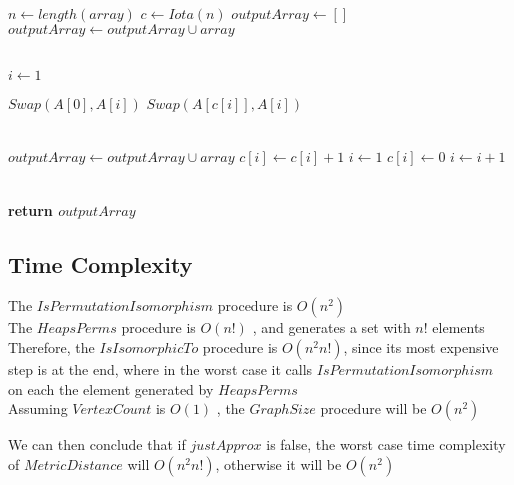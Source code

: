 \begin{algorithm}[h]
	\begin{algorithmic}[1]
		 
			\State $n \gets length(array)$
			\State $c \gets Iota(n)$ 
			\State $outputArray \gets []$
			\State $outputArray \gets outputArray \cup array$
			
			\\
			
			\State $i \gets 1$
			
						\State $Swap(A[0], A[i])$
					\Else
						\State $Swap(A[c[i]], A[i])$
					\EndIf
					
					\\
					
					\State $outputArray \gets outputArray \cup array$
					\State $c[i] \gets c[i] + 1$
					\State $i \gets 1$
				\Else
					\State $c[i] \gets 0$
					\State $i \gets i + 1$
				\EndIf
			\EndWhile
			
			\\
			
			\State \textbf{return $outputArray$}
		\EndProcedure		
	\end{algorithmic}
\end{algorithm}

\newpage

\subsection{Time Complexity}
The $IsPermutationIsomorphism$ procedure is $O(n^2)$ \\
The $HeapsPerms$ procedure is $O(n!)$ \cite{10.1093/comjnl/6.3.293}, and generates a set with $n!$ elements \\
Therefore, the $IsIsomorphicTo$ procedure is $O(n^2 n!)$, since its most expensive step is at the end, where in the worst case it calls $IsPermutationIsomorphism$ on each the element generated by $HeapsPerms$ \\
Assuming $VertexCount$ is $O(1)$ \cite{cppstandard}, the $GraphSize$ procedure will be $O(n^2)$

We can then conclude that if $justApprox$ is false, the worst case time complexity of $MetricDistance$ will $O(n^2 n!)$, otherwise it will be $O(n^2)$